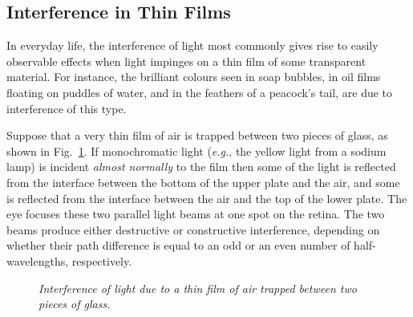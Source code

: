 \subsection{Interference in Thin Films}
In everyday life, the interference of light  most commonly gives rise to
easily observable effects when
light impinges on a thin film of some transparent material. For instance,
the brilliant colours seen in soap bubbles,  in oil
films floating on puddles of water,  and in the feathers of a peacock's
tail, are due to interference of this type. 

Suppose that a very thin film of air is trapped between two
pieces of glass, as shown in Fig.~\ref{f14.6}. If monochromatic light
({\em e.g.}, the yellow light from a sodium lamp) is incident {\em almost
normally}\/ to the film then some of the light is reflected from the
interface between the bottom of the upper plate and the air, and
some is reflected from the interface between the air and the top of the
lower plate. The eye focuses these two parallel light beams at one
spot on the retina. The two beams produce either destructive or constructive
interference, depending on whether their path difference is equal
to an odd or an even number of half-wavelengths, respectively.

\begin{figure}
\epsfysize=3in
\centerline{}
\caption{\em Interference of light due to a thin film of air trapped between
two pieces of glass.}\label{f14.6}
\end{figure}

